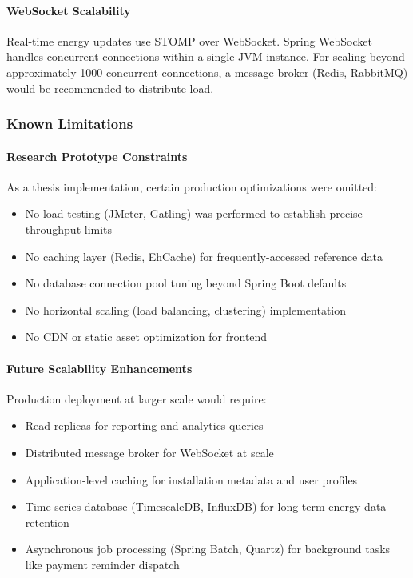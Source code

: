\paragraph{WebSocket Scalability}
Real-time energy updates use STOMP over WebSocket. Spring WebSocket handles concurrent connections within a single JVM instance. For scaling beyond approximately 1000 concurrent connections, a message broker (Redis, RabbitMQ) would be recommended to distribute load.

\subsubsection{Known Limitations}
\label{subsubsec:database-performance}

\paragraph{Research Prototype Constraints}
As a thesis implementation, certain production optimizations were omitted:
\begin{itemize}
    \item No load testing (JMeter, Gatling) was performed to establish precise throughput limits
    \item No caching layer (Redis, EhCache) for frequently-accessed reference data
    \item No database connection pool tuning beyond Spring Boot defaults
    \item No horizontal scaling (load balancing, clustering) implementation
    \item No CDN or static asset optimization for frontend
\end{itemize}

\paragraph{Future Scalability Enhancements}
Production deployment at larger scale would require:
\begin{itemize}
    \item Read replicas for reporting and analytics queries
    \item Distributed message broker for WebSocket at scale
    \item Application-level caching for installation metadata and user profiles
    \item Time-series database (TimescaleDB, InfluxDB) for long-term energy data retention
    \item Asynchronous job processing (Spring Batch, Quartz) for background tasks like payment reminder dispatch
\end{itemize}

